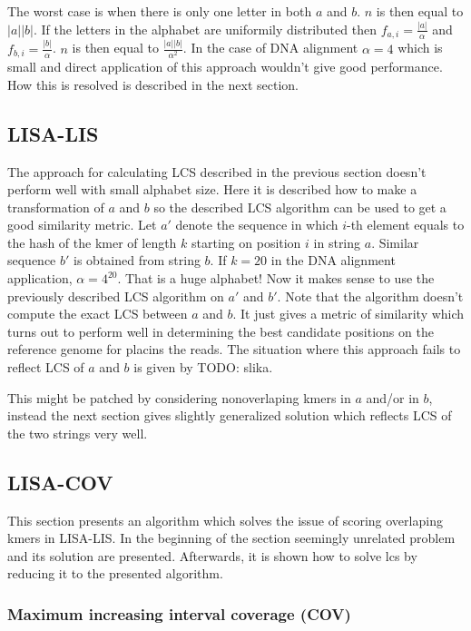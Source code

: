 \documentclass[times, utf8, diplomski]{fer}
\begin{document}
The worst case is when there is only one letter in both $a$ and $b$. $n$ is then equal to $|a||b|$.
If the letters in the alphabet are uniformily distributed then $f_{a,i}=\frac{|a|}{\alpha}$ and $f_{b,i}=\frac{|b|}{\alpha}$. $n$ is then equal to $\frac{|a||b|}{\alpha^2}$.
In the case of DNA alignment $\alpha=4$ which is small and direct application of this approach wouldn't give good performance. How this is resolved is described in the next section.

\subsection{LISA-LIS}

The approach for calculating LCS described in the previous section doesn't perform well with small alphabet size. Here it is described how to make a transformation of $a$ and $b$ so the described LCS algorithm can be used to get a good similarity metric. Let $a'$ denote the sequence in which $i$-th element equals to the hash of the kmer of length $k$ starting on position $i$ in string $a$. Similar sequence $b'$ is obtained from string $b$. If $k=20$ in the DNA alignment application, $\alpha=4^{20}$. That is a huge alphabet! Now it makes sense to use the previously described LCS algorithm on $a'$ and $b'$. Note that the algorithm doesn't compute the exact LCS between $a$ and $b$. It just gives a metric of similarity which turns out to perform well in determining the best candidate positions on the reference genome for placins the reads. The situation where this approach fails to reflect LCS of $a$ and $b$ is given by TODO: slika.

This might be patched by considering nonoverlaping kmers in $a$ and/or in $b$, instead the next section gives slightly generalized solution which reflects LCS of the two strings very well.

\subsection{LISA-COV}

This section presents an algorithm which solves the issue of scoring overlaping kmers in LISA-LIS. In the beginning of the section seemingly unrelated problem and its solution are presented. Afterwards, it is shown how to solve lcs by reducing it to the presented algorithm.

\subsubsection{Maximum increasing interval coverage (COV)}
\end{document}
